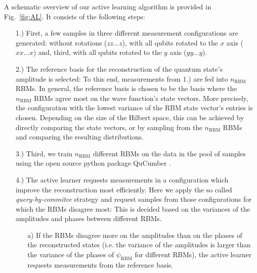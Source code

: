 \documentclass[pra,aps,showpacs,groupedaddress,superscriptaddress,twocolumn,toc=flat,biblatex,footinbib]{revtex4-1}
\begin{document}
A schematic overview of our active learning algorithm is provided in Fig.~\ref{fig:AL}. It consists of the following steps: 
\begin{itemize}
    \item[1.)] First, a few samples in three different measurement configurations are generated: without rotations ($zz\dots z$), with all qubits rotated to the $x$ axis ($xx\dots x$) and, third, with all qubits rotated to the $y$ axis ($yy\dots y$).
    \item[2.)] The reference basis for the reconstruction of the quantum state's amplitude is selected: To this end, measurements from 1.) are fed into $n_{\mathrm{RBM}}$ RBMs. In general, the reference basis is chosen to be the basis where the $n_{\mathrm{RBM}}$ RBMs agree most on the wave function's state vectors. More precisely, the configuration with the lowest variance of the RBM state vector's entries is chosen. Depending on the size of the Hilbert space, this can be achieved by directly comparing the state vectors, or by sampling from the $n_{\mathrm{RBM}}$ RBMs and comparing the resulting distributions. 
    \item[3.)] Third, we
    train $n_{\mathrm{RBM}}$ different RBMs on the data in the pool of samples using the open source python package QuCumber \cite{Beach2019}.
    \item[4.)] The active learner requests measurements in a configuration which improve the reconstruction most efficiently. Here we apply the so called \textit{query-by-commitee} strategy and request samples from those configurations for which the RBMs disagree most: This is decided based on the variances of the amplitudes and phases between different RBMs. \begin{itemize}
        \item [a)] If the RBMs disagree more on the amplitudes than on the phases of the reconstructed states (i.e. the variance of the amplitudes is larger than the variance of the phases of $\psi_{\mathrm{RBM}}$ for different RBMs), the active learner requests measurements from the reference basis.

\end{itemize}
\end{itemize}
\end{document}
